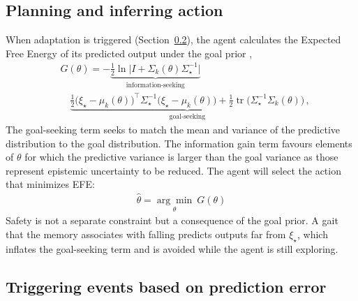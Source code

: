 \documentclass[lettersize,journal]{IEEEtran}
\DeclareMathOperator{\tr}{tr}
\begin{document}
\subsection{Planning and inferring action}
When adaptation is triggered (Section~\ref{sec:trigger}), the agent calculates the Expected Free Energy of its predicted output under the goal prior \cite{kouw2023information},
\begin{align} \label{eq:EFE}
    &G(\theta) = - \underbrace{\tfrac{1}{2}\ln\!\big|I + \Sigma_k(\theta) \Sigma_{\star}^{-1}\big|}_{\text{information-seeking}}  \\
	&\quad \underbrace{\tfrac{1}{2}\big(\xi_{\star} \! - \! \mu_k(\theta)\big)^{\!\top} \Sigma_{\star}^{-1} \big(\xi_{\star} \! - \! \mu_k(\theta)\big) \! +\! \tfrac{1}{2}\tr\!\big(\Sigma_{\star}^{-1}\Sigma_k(\theta)\big)}_{\text{goal-seeking}} \,, \nonumber
\end{align}
The goal-seeking term seeks to match the mean and variance of the predictive distribution to the goal distribution. The information gain term favours elements of $\theta$ for which the predictive variance is larger than the goal variance as those represent epistemic uncertainty to be reduced. The agent will select the action that minimizes EFE:
\begin{align}
	\hat{\theta} =  \underset{\theta}{\arg \min}\  G(\theta)
\end{align}
Safety is not a separate constraint but a consequence of the goal prior. A gait that the memory associates with falling predicts outputs far from $\xi_{\star}$, which inflates the goal-seeking term and is avoided while the agent is still exploring.

\subsection{Triggering events based on prediction error}
\label{sec:trigger}
\end{document}
